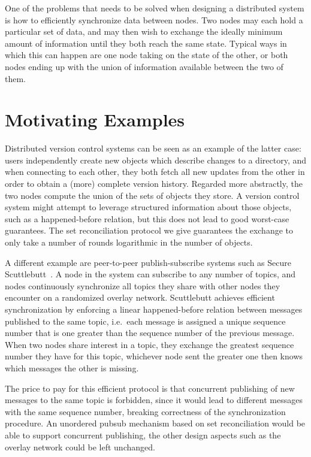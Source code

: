 
One of the problems that needs to be solved when designing a distributed system is how to efficiently synchronize data between nodes.
Two nodes may each hold a particular set of data, and may then wish to exchange the ideally minimum amount of information until they both reach the same state.
Typical ways in which this can happen are one node taking on the state of the other, or both nodes ending up with the union of information available between the two of them.

\section{Motivating Examples}

Distributed version control systems can be seen as an example of the latter case: users independently create new objects which describe changes to a directory, and when connecting to each other, they both fetch all new updates from the other in order to obtain a (more) complete version history.
Regarded more abstractly, the two nodes compute the union of the sets of objects they store.
A version control system might attempt to leverage structured information about those objects, such as a happened-before relation, but this does not lead to good worst-case guarantees.
The set reconciliation protocol we give guarantees the exchange to only take a number of rounds logarithmic in the number of objects.

A different example are peer-to-peer publish-subscribe systems such as
Secure Scuttlebutt~\cite{tarr2019secure}. A node in the system can subscribe to
any number of topics, and nodes continuously synchronize all topics they share
with other nodes they encounter on a randomized overlay network. Scuttlebutt achieves
efficient synchronization by enforcing a linear happened-before
relation between messages published to the same topic, i.e.~each message
is assigned a unique sequence number that is one greater than the
sequence number of the previous message. When two nodes share interest
in a topic, they exchange the greatest sequence number they have for
this topic, whichever node sent the greater one then knows which
messages the other is missing.

The price to pay for this efficient protocol is that concurrent publishing of new
messages to the same topic is forbidden, since it would lead to
different messages with the same sequence number, breaking correctness
of the synchronization procedure. An unordered pubsub mechanism based on
set reconciliation would be able to support concurrent publishing, the
other design aspects such as the overlay network could be left
unchanged.

